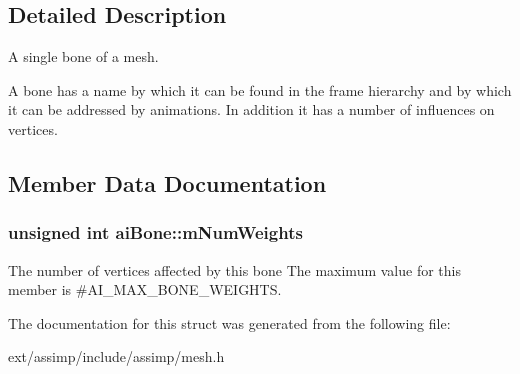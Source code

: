 \subsection{Detailed Description}
A single bone of a mesh. 

A bone has a name by which it can be found in the frame hierarchy and by which it can be addressed by animations. In addition it has a number of influences on vertices. 

\subsection{Member Data Documentation}
\hypertarget{structai_bone_a87a79d42a0132753aac66397ad6f9b71}{
\subsubsection[{m\-Num\-Weights}]{\setlength{\rightskip}{0pt plus 5cm}unsigned int ai\-Bone\-::m\-Num\-Weights}}\label{structai_bone_a87a79d42a0132753aac66397ad6f9b71}
The number of vertices affected by this bone The maximum value for this member is \#\-A\-I\-\_\-\-M\-A\-X\-\_\-\-B\-O\-N\-E\-\_\-\-W\-E\-I\-G\-H\-T\-S. 

The documentation for this struct was generated from the following file\-:\begin{DoxyCompactItemize}
\item 
ext/assimp/include/assimp/mesh.\-h\end{DoxyCompactItemize}
